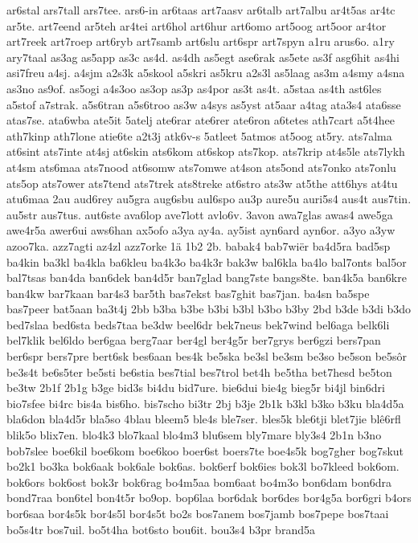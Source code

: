 {ar6stal
ars7tall
ars7tee.
ars6-in
ar6taas
art7aasv
ar6talb
art7albu
ar4t5as
ar4tc
ar5te.
art7eend
ar5teh
ar4tei
art6hol
art6hur
art6omo
art5oog
art5oor
ar4tor
art7reek
art7roep
art6ryb
art7samb
art6slu
art6spr
art7spyn
a1ru
arus6o.
a1ry
ary7taal
as3ag
as5app
as3c
as4d.
as4dh
as5egt
ase6rak
as5ete
as3f
asg6hit
as4hi
asi7freu
a4sj.
a4sjm
a2s3k
a5skool
a5skri
as5kru
a2s3l
as5laag
as3m
a4smy
a4sna
as3no
as9of.
as5ogi
a4s3oo
as3op
as3p
as4por
as3t
as4t.
a5staa
as4th
ast6les
a5stof
a7strak.
a5s6tran
a5s6troo
as3w
a4sys
as5yst
at5aar
a4tag
ata3s4
ata6sse
atas7se.
ata6wba
ate5it
5atelj
ate6rar
ate6rer
ate6ron
a6tetes
ath7cart
a5t4hee
ath7kinp
ath7lone
atie6te
a2t3j
atk6v-s
5atleet
5atmos
at5oog
at5ry.
ats7alma
at6sint
ats7inte
at4sj
at6skin
ats6kom
at6skop
ats7kop.
ats7krip
at4s5le
ats7lykh
at4sm
ats6maa
ats7nood
at6somw
ats7omwe
at4son
ats5ond
ats7onko
ats7onlu
ats5op
ats7ower
ats7tend
ats7trek
ats8treke
at6stro
ats3w
at5the
att6hys
at4tu
atu6maa
2au
aud6rey
au5gra
aug6sbu
aul6spo
au3p
aure5u
auri5s4
aus4t
aus7tin.
au5str
aus7tus.
aut6ste
ava6lop
ave7lott
avlo6v.
3avon
awa7glas
awas4
awe5ga
awe4r5a
awer6ui
aws6han
ax5ofo
a3ya
ay4a.
ay5ist
ayn6ard
ayn6or.
a3yo
a3yw
azoo7ka.
azz7agti
az4zl
azz7orke
1ä
1b2
2b.
babak4
bab7wiër
ba4d5ra
bad5sp
ba4kin
ba3kl
ba4kla
ba6kleu
ba4k3o
ba4k3r
bak3w
bal6kla
ba4lo
bal7onts
bal5or
bal7tsas
ban4da
ban6dek
ban4d5r
ban7glad
bang7ste
bangs8te.
ban4k5a
ban6kre
ban4kw
bar7kaan
bar4s3
bar5th
bas7ekst
bas7ghit
bas7jan.
ba4sn
ba5spe
bas7peer
bat5aan
ba3t4j
2bb
b3ba
b3be
b3bi
b3bl
b3bo
b3by
2bd
b3de
b3di
b3do
bed7slaa
bed6sta
beds7taa
be3dw
beel6dr
bek7neus
bek7wind
bel6aga
belk6li
bel7klik
bel6ldo
ber6gaa
berg7aar
ber4gl
ber4g5r
ber7grys
ber6gzi
bers7pan
ber6spr
bers7pre
bert6sk
bes6aan
bes4k
be5ska
be3sl
be3sm
be3so
be5son
be5sôr
be3s4t
be6s5ter
be5sti
be6stia
bes7tial
bes7trol
bet4h
be5tha
bet7hesd
be5ton
be3tw
2b1f
2b1g
b3ge
bid3s
bi4du
bid7ure.
bie6dui
bie4g
bieg5r
bi4jl
bin6dri
bio7sfee
bi4rc
bis4a
bis6ho.
bis7scho
bi3tr
2bj
b3je
2b1k
b3kl
b3ko
b3ku
bla4d5a
bla6don
bla4d5r
bla5so
4blau
bleem5
ble4s
ble7ser.
bles5k
ble6tji
blet7jie
blê6rfl
blik5o
blix7en.
blo4k3
blo7kaal
blo4m3
blu6sem
bly7mare
bly3s4
2b1n
b3no
bob7slee
boe6kil
boe6kom
boe6koo
boer6st
boers7te
boe4s5k
bog7gher
bog7skut
bo2k1
bo3ka
bok6aak
bok6ale
bok6as.
bok6erf
bok6ies
bok3l
bo7kleed
bok6om.
bok6ors
bok6ost
bok3r
bok6rag
bo4m5aa
bom6aat
bo4m3o
bon6dam
bon6dra
bond7raa
bon6tel
bon4t5r
bo9op.
bop6laa
bor6dak
bor6des
bor4g5a
bor6gri
b4ors
bor6saa
bor4s5k
bor4s5l
bor4s5t
bo2s
bos7anem
bos7jamb
bos7pepe
bos7taai
bo5s4tr
bos7uil.
bo5t4ha
bot6sto
bou6it.
bou3s4
b3pr
brand5a
}
